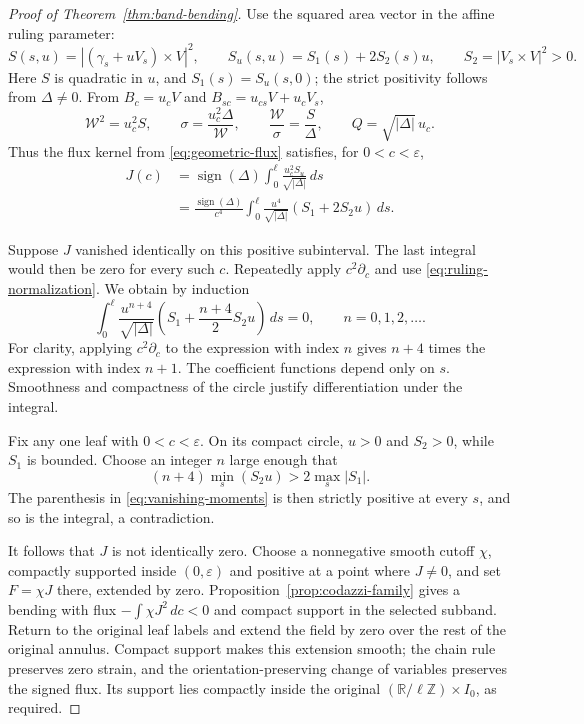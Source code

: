 \documentclass[11pt]{amsart}
\theoremstyle{definition}
\newcommand{\R}{\mathbb R}
\begin{document}
\begin{proof}[Proof of Theorem~\ref{thm:band-bending}]
Use the squared area vector in the affine ruling parameter:
\[
 S(s,u)=|(\gamma_s+uV_s)\times V|^2,\qquad
 S_u(s,u)=S_1(s)+2S_2(s)u,\qquad
 S_2=|V_s\times V|^2>0.
\]
Here $S$ is quadratic in $u$, and $S_1(s)=S_u(s,0)$;
the strict positivity follows from $\Delta\ne0$.
From $B_c=u_cV$ and $B_{sc}=u_{cs}V+u_cV_s$,
\[
 \mathcal W^2=u_c^2S,\qquad
 \sigma=\frac{u_c^2\Delta}{\mathcal W},\qquad
 \frac{\mathcal W}{\sigma}=\frac S\Delta,\qquad
 Q=\sqrt{|\Delta|}\,u_c .
\]
Thus the flux kernel from \eqref{eq:geometric-flux}
satisfies, for $0<c<\varepsilon$,
\begin{equation}\label{eq:direct-flux}
 \begin{aligned}
 J(c)&=\operatorname{sign}(\Delta)
       \int_0^\ell\frac{u_c^2S_u}{\sqrt{|\Delta|}}\,ds\\
 &=\frac{\operatorname{sign}(\Delta)}{c^4}
       \int_0^\ell
       \frac{u^4}{\sqrt{|\Delta|}}(S_1+2S_2u)\,ds .
 \end{aligned}
\end{equation}

Suppose $J$ vanished identically on this positive subinterval.
The last integral would then be zero for every such $c$.
Repeatedly apply $c^2\partial_c$ and use
\eqref{eq:ruling-normalization}. We obtain by induction
\begin{equation}\label{eq:vanishing-moments}
 \int_0^\ell\frac{u^{n+4}}{\sqrt{|\Delta|}}
       \left(S_1+\frac{n+4}{2}S_2u\right)\,ds=0,
 \qquad n=0,1,2,\ldots .
\end{equation}
For clarity, applying $c^2\partial_c$ to the expression with
index $n$ gives $n+4$ times the expression with index $n+1$.
The coefficient functions depend only on $s$.
Smoothness and compactness of the circle
justify differentiation under the integral.

Fix any one leaf with $0<c<\varepsilon$.
On its compact circle, $u>0$ and $S_2>0$, while $S_1$ is
bounded. Choose an integer $n$ large enough that
\[
 (n+4)\min_s(S_2u)>2\max_s|S_1|.
\]
The parenthesis in \eqref{eq:vanishing-moments} is then strictly
positive at every $s$, and so is the integral, a contradiction.

It follows that $J$ is not identically zero.
Choose a nonnegative smooth cutoff $\chi$, compactly supported
inside $(0,\varepsilon)$ and positive at a point where $J\ne0$,
and set $F=\chi J$ there, extended by zero.
Proposition~\ref{prop:codazzi-family} gives a bending with flux
$-\int\chi J^2\,dc<0$ and compact support in the selected subband.
Return to the original leaf labels and extend the field by zero
over the rest of the original annulus. Compact support makes
this extension smooth; the chain rule preserves zero strain,
and the orientation-preserving change of variables preserves
the signed flux. Its support lies compactly inside the original
$(\R/\ell\mathbb Z)\times I_0$, as required.
\end{proof}
\end{document}
